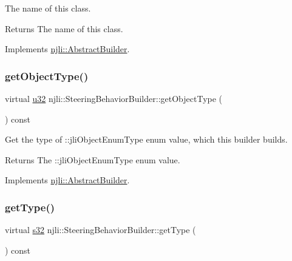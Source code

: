 The name of this class.

\begin{DoxyReturn}{Returns}
The name of this class. 
\end{DoxyReturn}


Implements \mbox{\hyperlink{classnjli_1_1_abstract_builder_a902f73ea78031b06aca183a417f3413b}{njli\+::\+Abstract\+Builder}}.

\mbox{\label{classnjli_1_1_steering_behavior_builder_a290dc340ce59ecfb5a0fab8a8d93fb4b}} 
\subsubsection{\texorpdfstring{get\+Object\+Type()}{getObjectType()}}
{\footnotesize\ttfamily virtual \mbox{\hyperlink{_util_8h_a10e94b422ef0c20dcdec20d31a1f5049}{u32}} njli\+::\+Steering\+Behavior\+Builder\+::get\+Object\+Type (\begin{DoxyParamCaption}{ }\end{DoxyParamCaption}) const\hspace{0.3cm}{\ttfamily [virtual]}}

Get the type of \+::jli\+Object\+Enum\+Type enum value, which this builder builds.

\begin{DoxyReturn}{Returns}
The \+::jli\+Object\+Enum\+Type enum value. 
\end{DoxyReturn}


Implements \mbox{\hyperlink{classnjli_1_1_abstract_builder_a0f2d344fcf697b167f4f2b1122b5fb33}{njli\+::\+Abstract\+Builder}}.

\mbox{\label{classnjli_1_1_steering_behavior_builder_a8c24ce33c8524273aecb7f9a5d34bd61}} 
\subsubsection{\texorpdfstring{get\+Type()}{getType()}}
{\footnotesize\ttfamily virtual \mbox{\hyperlink{_util_8h_aa62c75d314a0d1f37f79c4b73b2292e2}{s32}} njli\+::\+Steering\+Behavior\+Builder\+::get\+Type (\begin{DoxyParamCaption}{ }\end{DoxyParamCaption}) const\hspace{0.3cm}{\ttfamily [virtual]}}

